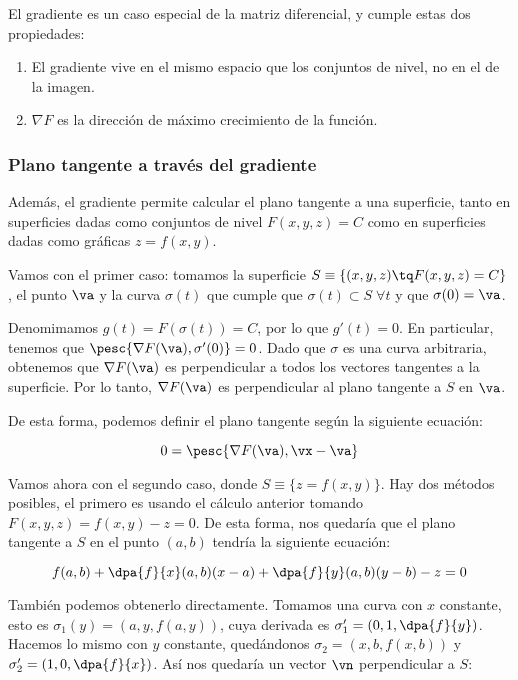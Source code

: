 \documentclass[12pt,a4paper,titlepage]{apuntes}
\begin{document}
El gradiente es un caso especial de la matriz diferencial, y cumple estas dos propiedades:

\begin{enumerate}
\item El gradiente vive en el mismo espacio que los conjuntos de nivel, no en el de la imagen.
\item $\nabla F$ es la dirección de máximo crecimiento de la función.
\end{enumerate}

\subsubsection{Plano tangente a través del gradiente}
Además, el gradiente permite calcular el plano tangente a una superficie, tanto en superficies dadas como conjuntos de nivel $F(x,y,z) = C$ como en superficies dadas como gráficas $z=f(x,y)$. 

Vamos con el primer caso: tomamos la superficie $S\equiv \{(x,y,z) \tq F(x,y,z) = C\}$, el punto $\va$ y la curva $\sigma (t)$ que cumple que $\sigma (t) \subset S \; \forall t$ y que $\sigma (0) = \va$.

Denomimamos $g(t) = F(\sigma(t)) = C$, por lo que $g'(t) =0$. En particular, tenemos que $\pesc{\nabla F (\va),\sigma ' (0)}= 0$. Dado que $\sigma$ es una curva arbitraria, obtenemos que $\nabla F (\va)$ es perpendicular a todos los vectores tangentes a la superficie. Por lo tanto, $\nabla F (\va)$ es perpendicular al plano tangente a $S$ en $\va$.

De esta forma, podemos definir el plano tangente según la siguiente ecuación:

\[ 0 =\pesc{\nabla F(\va), \vx -\va} \]

Vamos ahora con el segundo caso, donde $S\equiv \{z=f(x,y) \}$. Hay dos métodos posibles, el primero es usando el cálculo anterior tomando $F(x,y,z) = f(x,y) - z = 0$. De esta forma, nos quedaría que el plano tangente a $S$ en el punto $(a,b)$ tendría la siguiente ecuación:

\[ f(a,b) + \dpa{f}{x} (a,b) (x-a)+\dpa{f}{y}(a,b) (y-b) - z = 0 \]

También podemos obtenerlo directamente. Tomamos una curva con $x$ constante, esto es $\sigma_1(y) = (a,y, f(a,y))$, cuya derivada es $\sigma_1'=(0,1,\dpa{f}{y})$. Hacemos lo mismo con $y$ constante, quedándonos $\sigma_2 = (x, b, f(x,b))$ y $\sigma_2 ' = (1, 0, \dpa{f}{x})$. Así nos quedaría un vector $\vn$ perpendicular a $S$:
\end{document}
